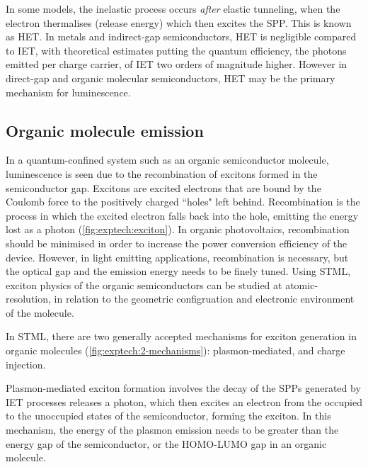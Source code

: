 In some models, the inelastic process occurs \emph{after} elastic tunneling, when the electron thermalises (release energy) which then excites the \ac{SPP}. This is known as \acf{HET}. In metals and indirect-gap semiconductors, \ac{HET} is negligible compared to \ac{IET}, with theoretical estimates putting the quantum efficiency, the photons emitted per charge carrier, of \ac{IET} two orders of magnitude higher. However in direct-gap and organic molecular semiconductors, \ac{HET} may be the primary mechanism for luminescence.

\begin{figure} [h]
    \centering
    \caption{ }
    \label{fig:exptech:iet-het}
\end{figure}

\subsection{Organic molecule emission}

In a quantum-confined system such as an organic semiconductor molecule, luminescence is seen due to the recombination of excitons formed in the semiconductor gap. Excitons are excited electrons that are bound by the Coulomb force to the positively charged ``holes" left behind. Recombination is the process in which the excited electron falls back into the hole, emitting the energy lost as a photon (\autoref{fig:exptech:exciton}). In organic photovoltaics, recombination should be minimised in order to increase the power conversion efficiency of the device. However, in light emitting applications, recombination is necessary, but the optical gap and the emission energy needs to be finely tuned. Using \ac{STML}, exciton physics of the organic semiconductors can be studied at atomic-resolution, in relation to the geometric configruation and electronic environment of the molecule.

\begin{figure} [h]
    \centering
    \caption{ }
    \label{fig:exptech:exciton}
\end{figure}

In \ac{STML}, there are two generally accepted mechanisms for exciton generation in organic molecules (\autoref{fig:exptech:2-mechanisms}): plasmon-mediated, and charge injection.

Plasmon-mediated exciton formation involves the decay of the \acp{SPP} generated by \ac{IET} processes releases a photon, which then excites an electron from the occupied to the unoccupied states of the semiconductor, forming the exciton. In this mechanism, the energy of the plasmon emission needs to be greater than the energy gap of the semiconductor, or the \ac{HOMO}-\ac{LUMO} gap in an organic molecule. 

